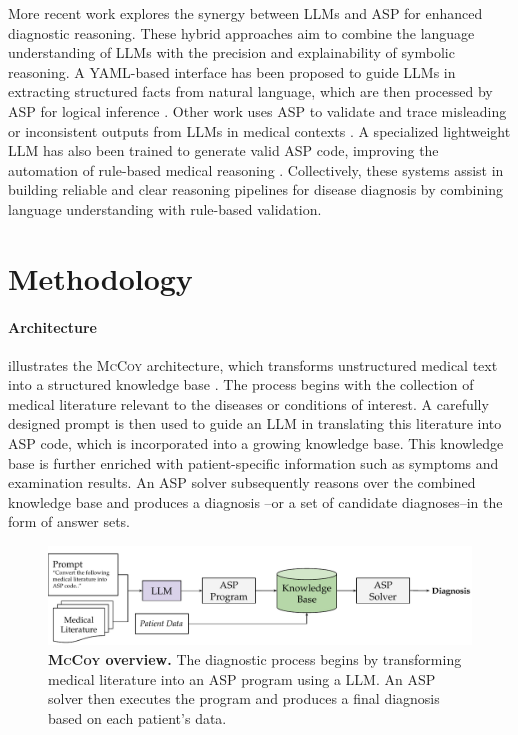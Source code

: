 \documentclass[11pt,leqno]{amsart}
\newcommand{\sys}{\textsc{McCoy}\xspace}
\begin{document}
More recent work explores the synergy between LLMs and ASP 
for enhanced diagnostic reasoning. 
These hybrid approaches aim to combine the language understanding of LLMs 
with the precision and explainability of symbolic reasoning. 
A YAML-based interface has been proposed to guide LLMs 
in extracting structured facts from natural language, 
which are then processed by ASP for logical inference \cite{alviano2024llm2asp}. 
Other work uses ASP to validate and trace misleading or inconsistent outputs 
from LLMs in medical contexts \cite{Nguyen2025}. 
A specialized lightweight LLM has also been trained to generate valid ASP code, 
improving the automation of rule-based medical reasoning \cite{coppolillo2024llasp}.
Collectively, these systems assist in building reliable and clear reasoning pipelines 
for disease diagnosis by combining language understanding with rule-based validation.

\section{Methodology} \label{sec:methodology}

\paragraph{\textbf{Architecture}}

 illustrates the \sys architecture, 
which transforms unstructured medical text into a structured knowledge base \cite{ré2014feature}. 
The process begins with the collection of medical literature relevant to the diseases or conditions of interest. 
A carefully designed prompt is then used to guide an LLM in translating this literature into ASP code, 
which is incorporated into a growing knowledge base. 
This knowledge base is further enriched with patient-specific information such as symptoms and examination results. 
An ASP solver subsequently reasons over the combined knowledge base and produces a diagnosis
--or a set of candidate diagnoses--in the form of answer sets.

\begin{figure}[!h]
    \includegraphics[width=\textwidth]{assets/mccoy.pdf}
    \caption{\textbf{\sys overview.} The diagnostic process begins by transforming medical literature 
    into an ASP program using a LLM. 
    An ASP solver then executes the program and produces a final diagnosis 
    based on each patient’s data.}
    \label{fig:architecture}
\end{figure}
\end{document}
